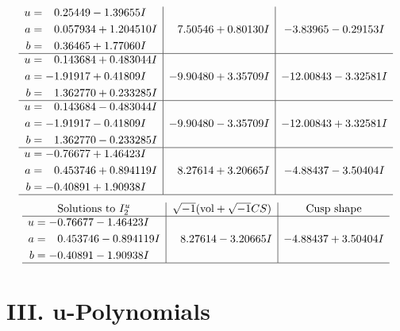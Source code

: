 \documentclass[1p]{elsarticle_modified}
\theoremstyle{definition}
\newcommand{\I}{\sqrt{-1}}
\begin{document}
$$\begin{array}{c|c|c}
\begin{aligned}
u &= \phantom{-}0.25449 - 1.39655 I \\
a &= \phantom{-}0.057934 + 1.204510 I \\
b &= \phantom{-}0.36465 + 1.77060 I\end{aligned}
 & \phantom{-}7.50546 + 0.80130 I & -3.83965 - 0.29153 I \\ \hline\begin{aligned}
u &= \phantom{-}0.143684 + 0.483044 I \\
a &= -1.91917 + 0.41809 I \\
b &= \phantom{-}1.362770 + 0.233285 I\end{aligned}
 & -9.90480 + 3.35709 I & -12.00843 - 3.32581 I \\ \hline\begin{aligned}
u &= \phantom{-}0.143684 - 0.483044 I \\
a &= -1.91917 - 0.41809 I \\
b &= \phantom{-}1.362770 - 0.233285 I\end{aligned}
 & -9.90480 - 3.35709 I & -12.00843 + 3.32581 I \\ \hline\begin{aligned}
u &= -0.76677 + 1.46423 I \\
a &= \phantom{-}0.453746 + 0.894119 I \\
b &= -0.40891 + 1.90938 I\end{aligned}
 & \phantom{-}8.27614 + 3.20665 I & -4.88437 - 3.50404 I\\
 \hline 
 \end{array}$$\newpage$$\begin{array}{c|c|c}  
\text{Solutions to }I^u_{2}& \I (\text{vol} + \sqrt{-1}CS) & \text{Cusp shape}\\
 \hline 
\begin{aligned}
u &= -0.76677 - 1.46423 I \\
a &= \phantom{-}0.453746 - 0.894119 I \\
b &= -0.40891 - 1.90938 I\end{aligned}
 & \phantom{-}8.27614 - 3.20665 I & -4.88437 + 3.50404 I\\
 \hline 
 \end{array}$$\newpage
\newpage\renewcommand{\arraystretch}{1}
\centering \section*{ III. u-Polynomials}
\end{document}
